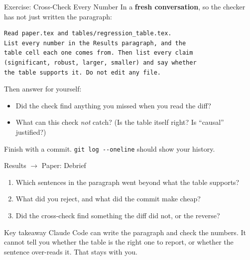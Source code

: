 \documentclass[aspectratio=169, 11pt]{beamer}
\begin{document}
\begin{frame}[fragile]{Exercise: Cross-Check Every Number}
  In a \textbf{fresh conversation}, so the checker has not just written the paragraph:

  \begin{lstlisting}[basicstyle=\ttfamily\footnotesize]
Read paper.tex and tables/regression_table.tex.
List every number in the Results paragraph, and the
table cell each one comes from. Then list every claim
(significant, robust, larger, smaller) and say whether
the table supports it. Do not edit any file.
  \end{lstlisting}

  \vspace{0.3em}
  Then answer for yourself:
  \begin{itemize}
    \small
    \item Did the check find anything you missed when you read the diff?
    \item What can this check \emph{not} catch? (Is the table itself right? Is ``causal'' justified?)
  \end{itemize}

  \vspace{0.3em}
  \alert{\small Finish with a commit. \texttt{git log -{}-oneline} should show your history.}
\end{frame}

\begin{frame}{Results $\rightarrow$ Paper: Debrief}
  \begin{enumerate}
    \item Which sentences in the paragraph went beyond what the table supports?
    \item What did you reject, and what did the commit make cheap?
    \item Did the cross-check find something the diff did not, or the reverse?
  \end{enumerate}

  \vspace{0.5em}
  \begin{block}{Key takeaway}
    Claude Code can write the paragraph and check the numbers. It cannot tell you whether the table is the right one to report, or whether the sentence over-reads it. That stays with you.
  \end{block}
\end{frame}

\end{document}
